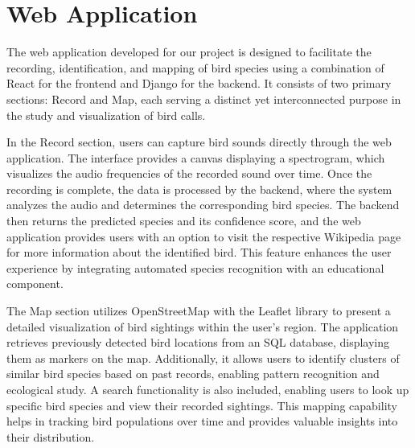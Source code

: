 

\section{Web Application}
The web application developed for our project is designed to facilitate the recording, identification, and mapping of bird species using a combination of React for the frontend and Django for the backend. It consists of two primary sections: Record and Map, each serving a distinct yet interconnected purpose in the study and visualization of bird calls.

In the Record section, users can capture bird sounds directly through the web application. The interface provides a canvas displaying a spectrogram, which visualizes the audio frequencies of the recorded sound over time. Once the recording is complete, the data is processed by the backend, where the system analyzes the audio and determines the corresponding bird species. The backend then returns the predicted species and its confidence score, and the web application provides users with an option to visit the respective Wikipedia page for more information about the identified bird. This feature enhances the user experience by integrating automated species recognition with an educational component.

The Map section utilizes OpenStreetMap with the Leaflet library to present a detailed visualization of bird sightings within the user's region. The application retrieves previously detected bird locations from an SQL database, displaying them as markers on the map. Additionally, it allows users to identify clusters of similar bird species based on past records, enabling pattern recognition and ecological study. A search functionality is also included, enabling users to look up specific bird species and view their recorded sightings. This mapping capability helps in tracking bird populations over time and provides valuable insights into their distribution.

